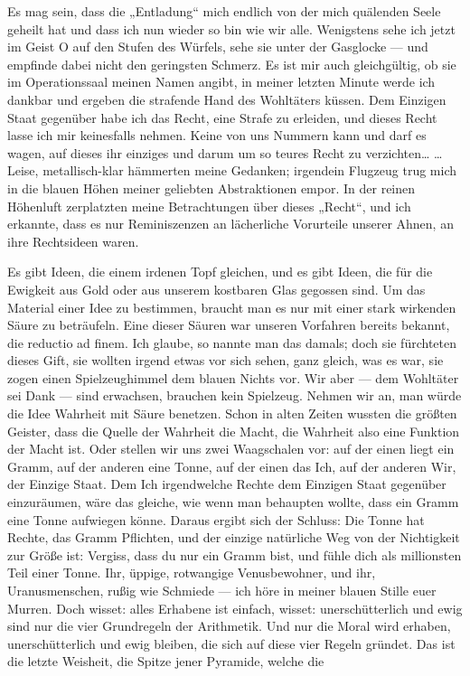 Es mag sein, dass die „Entladung“ mich endlich von der mich
quälenden Seele geheilt hat und dass ich nun wieder so bin wie wir
alle. Wenigstens sehe ich jetzt im Geist O auf den Stufen des
Würfels, sehe sie unter der Gasglocke — und empfinde dabei nicht
den geringsten Schmerz. Es ist mir auch gleichgültig, ob sie im
Operationssaal meinen Namen angibt, in meiner letzten Minute werde
ich dankbar und ergeben die strafende Hand des Wohltäters küssen.
Dem Einzigen Staat gegenüber habe ich das Recht, eine Strafe zu
erleiden, und dieses Recht lasse ich mir keinesfalls nehmen. Keine
von uns Nummern kann und darf es wagen, auf dieses ihr einziges und
darum um so teures Recht zu verzichten\ldots{} \ldots{} Leise,
metallisch-klar hämmerten meine Gedanken; irgendein Flugzeug trug
mich in die blauen Höhen meiner geliebten Abstraktionen empor. In
der reinen Höhenluft zerplatzten meine Betrachtungen über dieses
„Recht“, und ich erkannte, dass es nur Reminiszenzen an lächerliche
Vorurteile unserer Ahnen, an ihre Rechtsideen waren.

Es gibt Ideen, die einem irdenen Topf gleichen, und es gibt Ideen,
die für die Ewigkeit aus Gold oder aus unserem kostbaren Glas
gegossen sind. Um das Material einer Idee zu bestimmen, braucht man
es nur mit einer stark wirkenden Säure zu beträufeln. Eine dieser
Säuren war unseren Vorfahren bereits bekannt, die reductio ad
finem. Ich glaube, so nannte man das damals; doch sie fürchteten
dieses Gift, sie wollten irgend etwas vor sich sehen, ganz gleich,
was es war, sie zogen einen Spielzeughimmel dem blauen Nichts vor.
Wir aber — dem Wohltäter sei Dank — sind erwachsen, brauchen kein
Spielzeug. Nehmen wir an, man würde die Idee Wahrheit mit Säure
benetzen. Schon in alten Zeiten wussten die größten Geister, dass
die Quelle der Wahrheit die Macht, die Wahrheit also eine Funktion
der Macht ist. Oder stellen wir uns zwei Waagschalen vor: auf der
einen liegt ein Gramm, auf der anderen eine Tonne, auf der einen
das Ich, auf der anderen Wir, der Einzige Staat. Dem Ich
irgendwelche Rechte dem Einzigen Staat gegenüber einzuräumen, wäre
das gleiche, wie wenn man behaupten wollte, dass ein Gramm eine
Tonne aufwiegen könne. Daraus ergibt sich der Schluss: Die Tonne
hat Rechte, das Gramm Pflichten, und der einzige natürliche Weg von
der Nichtigkeit zur Größe ist: Vergiss, dass du nur ein Gramm bist,
und fühle dich als millionsten Teil einer Tonne. Ihr, üppige,
rotwangige Venusbewohner, und ihr, Uranusmenschen, rußig wie
Schmiede — ich höre in meiner blauen Stille euer Murren. Doch
wisset: alles Erhabene ist einfach, wisset: unerschütterlich und
ewig sind nur die vier Grundregeln der Arithmetik. Und nur die
Moral wird erhaben, unerschütterlich und ewig bleiben, die sich auf
diese vier Regeln gründet. Das ist die letzte Weisheit, die Spitze
jener Pyramide, welche die

